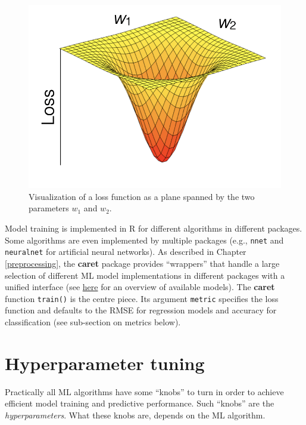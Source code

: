 \documentclass[
]{book}
\begin{document}
\begin{figure}

{\centering \includegraphics[width=11.5in]{./fig/loss_plane} 

}

\caption{Visualization of a loss function as a plane spanned by the two parameters $w_1$ and $w_2$.}\label{fig:unnamed-chunk-22}
\end{figure}

Model training is implemented in R for different algorithms in different packages. Some algorithms are even implemented by multiple packages (e.g., \texttt{nnet} and \texttt{neuralnet} for artificial neural networks). As described in Chapter \ref{preprocessing}, the \textbf{caret} package provides ``wrappers'' that handle a large selection of different ML model implementations in different packages with a unified interface (see \href{https://topepo.github.io/caret/available-models.html}{here} for an overview of available models). The \textbf{caret} function \texttt{train()} is the centre piece. Its argument \texttt{metric} specifies the loss function and defaults to the RMSE for regression models and accuracy for classification (see sub-section on metrics below).

\hypertarget{hyperparameter-tuning}{%
\section{Hyperparameter tuning}\label{hyperparameter-tuning}}

Practically all ML algorithms have some ``knobs'' to turn in order to achieve efficient model training and predictive performance. Such ``knobs'' are the \emph{hyperparameters}. What these knobs are, depends on the ML algorithm.
\end{document}
